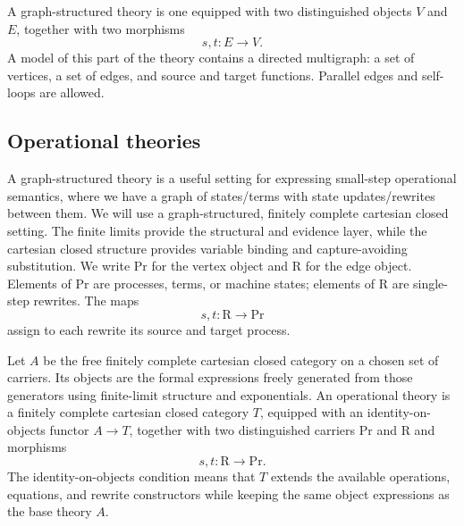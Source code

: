 \documentclass[11pt]{article}
\newcommand{\Proc}{\mathrm{Pr}}
\newcommand{\Rew}{\mathrm{R}}
\begin{document}
A graph-structured theory is one equipped with two distinguished objects \(V\) and \(E\), together with two morphisms
\[
s,t:E\to V.
\]
A model of this part of the theory contains a directed multigraph: a set of vertices, a set of edges, and source and target functions.  Parallel edges and self-loops are allowed.

\subsection{Operational theories}

A graph-structured theory is a useful setting for expressing small-step operational semantics, where we have a graph of states/terms with state updates/rewrites between them.  We will use a graph-structured, finitely complete cartesian closed setting.  The finite limits provide the structural and evidence layer, while the cartesian closed structure provides variable binding and capture-avoiding substitution.  We write \(\Proc\) for the vertex object and \(\Rew\) for the edge object.  Elements of \(\Proc\) are processes, terms, or machine states; elements of \(\Rew\) are single-step rewrites.  The maps
\[
s,t:\Rew\to\Proc
\]
assign to each rewrite its source and target process.

Let \(A\) be the free finitely complete cartesian closed category on a chosen set of carriers.  Its objects are the formal expressions freely generated from those generators using finite-limit structure and exponentials.  An operational theory is a finitely complete cartesian closed category \(T\), equipped with an identity-on-objects functor \(A\to T\), together with two distinguished carriers \(\Proc\) and \(\Rew\) and morphisms
\[
s,t:\Rew\to\Proc.
\]
The identity-on-objects condition means that \(T\) extends the available
operations, equations, and rewrite constructors while keeping the same
object expressions as the base theory \(A\).
\end{document}
